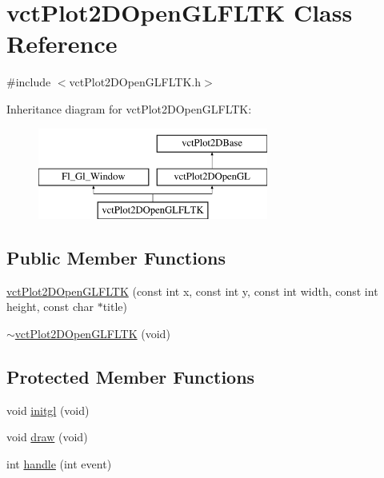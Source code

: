 \hypertarget{classvct_plot2_d_open_g_l_f_l_t_k}{}\section{vct\+Plot2\+D\+Open\+G\+L\+F\+L\+T\+K Class Reference}
\label{classvct_plot2_d_open_g_l_f_l_t_k}


{\ttfamily \#include $<$vct\+Plot2\+D\+Open\+G\+L\+F\+L\+T\+K.\+h$>$}

Inheritance diagram for vct\+Plot2\+D\+Open\+G\+L\+F\+L\+T\+K\+:\begin{figure}[H]
\begin{center}
\leavevmode
\includegraphics[height=3.000000cm]{d3/dc7/classvct_plot2_d_open_g_l_f_l_t_k}
\end{center}
\end{figure}
\subsection*{Public Member Functions}
\begin{DoxyCompactItemize}
\item 
\hyperlink{classvct_plot2_d_open_g_l_f_l_t_k_aca6e39baf7bc695ae114921b6af3f422}{vct\+Plot2\+D\+Open\+G\+L\+F\+L\+T\+K} (const int x, const int y, const int width, const int height, const char $\ast$title)
\item 
\hyperlink{classvct_plot2_d_open_g_l_f_l_t_k_a65d2f91381159a8bad81a73f43db5bb9}{$\sim$vct\+Plot2\+D\+Open\+G\+L\+F\+L\+T\+K} (void)
\end{DoxyCompactItemize}
\subsection*{Protected Member Functions}
{\bf }\par
\begin{DoxyCompactItemize}
\item 
void \hyperlink{classvct_plot2_d_open_g_l_f_l_t_k_a66344a83a421e77f00c708a81a7d1f9c}{initgl} (void)
\item 
void \hyperlink{classvct_plot2_d_open_g_l_f_l_t_k_a6cff7bc71c830083ed646cc25e5d855a}{draw} (void)
\item 
int \hyperlink{classvct_plot2_d_open_g_l_f_l_t_k_a9cb73c6bbde698823cf09f926f9820d7}{handle} (int event)
\end{DoxyCompactItemize}

